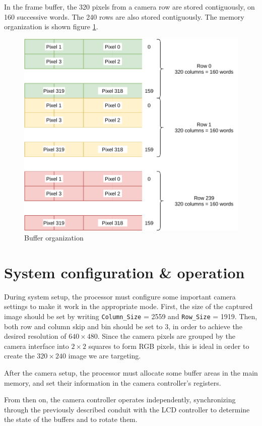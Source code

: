 \documentclass[12pt,a4paper]{article}
\begin{document}
In the frame buffer, the 320 pixels from a camera row are stored contiguously, on 160 successive words. The 240 rows are also stored contiguously. The memory organization is shown figure \ref{fig:buffer}.

\begin{figure}[h]
	\centering
	\includegraphics[width=.7\textwidth]{figures/buffer}
	\caption{Buffer organization}
	\label{fig:buffer}
\end{figure}


\section{System configuration \& operation}

During system setup, the processor must configure some important camera settings to make it work in the appropriate mode. First, the size of the captured image should be set by writing \texttt{Column\_Size} = 2559 and \texttt{Row\_Size} = 1919. Then, both row and column skip and bin should be set to 3, in order to achieve the desired resolution of $640 \times 480$. Since the camera pixels are grouped by the camera interface into $2 \times 2$ squares to form RGB pixels, this is ideal in order to create the $320 \times 240$ image we are targeting.

After the camera setup, the processor must allocate some buffer areas in the main memory, and set their information in the camera controller's registers.

From then on, the camera controller operates independently, synchronizing through the previously described conduit with the LCD controller to determine the state of the buffers and to rotate them.
\end{document}
